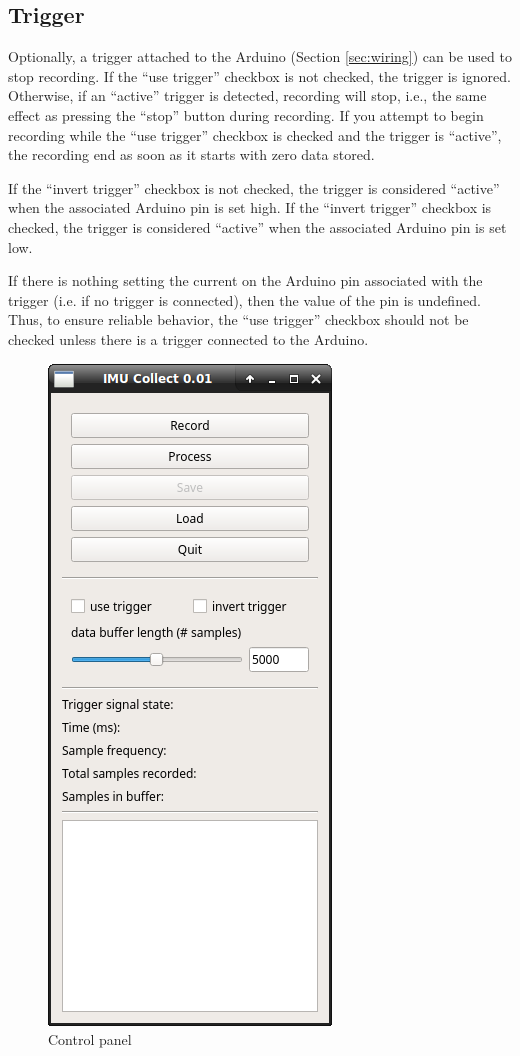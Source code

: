 \documentclass[11pt,letterpaper,article,oneside]{memoir}
\begin{document}
\subsection{Trigger}

Optionally, a trigger attached to the Arduino (Section \ref{sec:wiring}) can be
used to stop recording.  If the ``use trigger'' checkbox is not checked, the
trigger is ignored. Otherwise, if an ``active'' trigger is detected, recording
will stop, i.e., the same effect as pressing the ``stop'' button during
recording. If you attempt to begin recording while the ``use trigger'' checkbox
is checked and the trigger is ``active'', the recording end as soon as it starts
with zero data stored.

If the ``invert trigger'' checkbox is not checked, the trigger is considered
``active'' when the associated Arduino pin is set high. If the ``invert
trigger'' checkbox is checked, the trigger is considered ``active'' when the
associated Arduino pin is set low.

If there is nothing setting the current on the Arduino pin associated with the
trigger (i.e. if no trigger is connected), then the value of the pin is
undefined.  Thus, to ensure reliable behavior, the ``use trigger'' checkbox
should not be checked unless there is a trigger connected to the Arduino.

\begin{figure}[]
    \begin{center}
        \includegraphics[width=.45\textwidth]{screenshot_0_imu}
    \end{center}
    \caption{Control panel} 
\end{figure}
\end{document}
